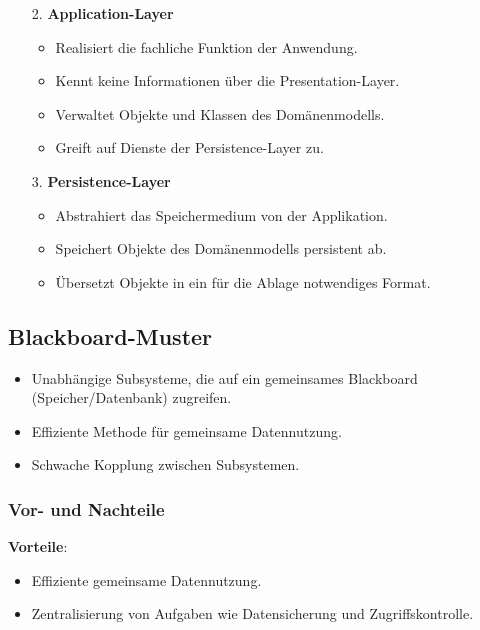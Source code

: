 \documentclass[11pt, a4paper]{article}
\begin{document}
\begin{minipage}[h]{0.45\textwidth}
    \tiny
    \begin{enumerate}
        \item[2.] \textbf{Application-Layer}
        \begin{itemize}
            \item Realisiert die fachliche Funktion der Anwendung.
            \item Kennt keine Informationen über die Presentation-Layer.
            \item Verwaltet Objekte und Klassen des Domänenmodells.
            \item Greift auf Dienste der Persistence-Layer zu.
        \end{itemize}
    \end{enumerate}
\end{minipage}
\begin{minipage}[h]{0.45\textwidth}
    \tiny
    \begin{enumerate}
        \item[3.] \textbf{Persistence-Layer}
        \begin{itemize}
            \item Abstrahiert das Speichermedium von der Applikation.
            \item Speichert Objekte des Domänenmodells persistent ab.
            \item Übersetzt Objekte in ein für die Ablage notwendiges Format.
        \end{itemize}
    \end{enumerate}
\end{minipage}

\vspace{10em}

\subsection{Blackboard-Muster}

\begin{itemize}
    \item Unabhängige Subsysteme, die auf ein gemeinsames Blackboard (Speicher/Datenbank) zugreifen.
    \item Effiziente Methode für gemeinsame Datennutzung.
    \item Schwache Kopplung zwischen Subsystemen.
\end{itemize}

\subsubsection{Vor- und Nachteile}
\textbf{Vorteile}:
\begin{itemize}
    \item Effiziente gemeinsame Datennutzung.
    \item Zentralisierung von Aufgaben wie Datensicherung und Zugriffskontrolle.
\end{itemize}
\end{document}
